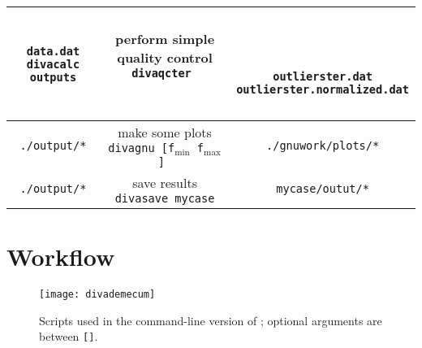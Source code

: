 \begin{table}[H]
{{\begin{tabular}{c|c|c}
{ {\tt data.dat} \\
{\tt divacalc outputs}
}
 & 
\shortstack{
{  { }  } \\
{\sf perform simple quality control} \\
{\tt divaqcter } 
\\
{  { }  } \\
{  { }  } \\
{  { }  }
}
& 
\shortstack{
{  { }  } \\
{  { }  } \\
{  { }  } \\
{{\tt outlierster.dat}} \\
{{\tt outlierster.normalized.dat}} \\
{  { }  } \\
{  { }  } 
} \\ \hline
{\tt ./output/*}  & 
\shortstack{
{\sf make some plots} \\
{\tt divagnu [f$_{\min}$ f$_{\max}$] } 
} & {\tt ./gnuwork/plots/*} \\ \hline
{\tt ./output/*}  & 
\shortstack{
{\sf save results} \\
{\tt divasave mycase} 
}
& {\tt mycase/outut/*} \\ 
\bottomrule
\end{tabular}
}}
\end{table}



\section{Workflow}


\begin{figure}[H]
\centering
\texttt{[image: divademecum]}
\caption{Scripts used in the command-line version of \diva; optional arguments are between {\tt []}.}
\end{figure}





